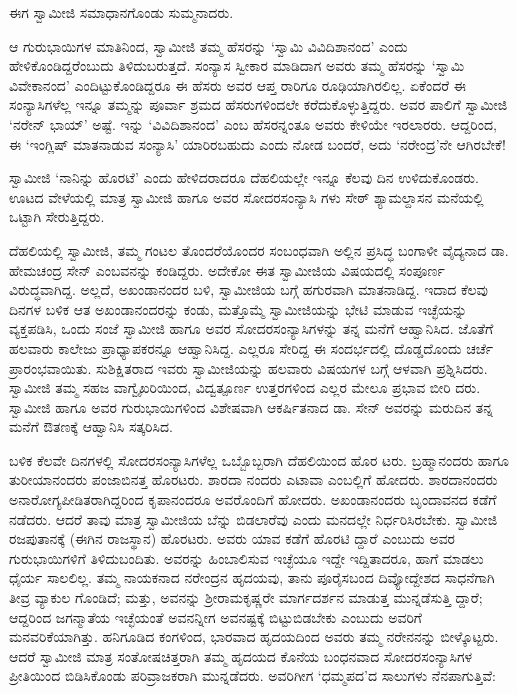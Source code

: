 ಈಗ ಸ್ವಾಮೀಜಿ ಸಮಾಧಾನಗೊಂಡು ಸುಮ್ಮನಾದರು.

ಆ ಗುರುಭಾಯಿಗಳ ಮಾತಿನಿಂದ, ಸ್ವಾಮೀಜಿ ತಮ್ಮ ಹೆಸರನ್ನು ‘ಸ್ವಾಮಿ ವಿವಿದಿಶಾನಂದ’ ಎಂದು ಹೇಳಿಕೊಂಡಿದ್ದರೆಂಬುದು ತಿಳಿದುಬರುತ್ತದೆ. ಸಂನ್ಯಾಸ ಸ್ವೀಕಾರ ಮಾಡಿದಾಗ ಅವರು ತಮ್ಮ ಹೆಸರನ್ನು ‘ಸ್ವಾಮಿ ವಿವೇಕಾನಂದ’ ಎಂದಿಟ್ಟುಕೊಂಡಿದ್ದರೂ ಈ ಹೆಸರು ಅವರ ಆಪ್ತ ರಾರಿಗೂ ರೂಢಿಯಾಗಿರಲಿಲ್ಲ. ಏಕೆಂದರೆ ಈ ಸಂನ್ಯಾಸಿಗಳೆಲ್ಲ ಇನ್ನೂ ತಮ್ಮನ್ನು ಪೂರ್ವಾ ಶ್ರಮದ ಹೆಸರುಗಳಿಂದಲೇ ಕರೆದುಕೊಳ್ಳುತ್ತಿದ್ದರು. ಅವರ ಪಾಲಿಗೆ ಸ್ವಾಮೀಜಿ ‘ನರೇನ್ ಭಾಯ್’ ಅಷ್ಟೆ. ಇನ್ನು ‘ವಿವಿದಿಶಾನಂದ’ ಎಂಬ ಹೆಸರನ್ನಂತೂ ಅವರು ಕೇಳಿಯೇ ಇರಲಾರರು. ಆದ್ದರಿಂದ, ಈ ‘ಇಂಗ್ಲಿಷ್ ಮಾತನಾಡುವ ಸಂನ್ಯಾಸಿ’ ಯಾರಿರಬಹುದು ಎಂದು ನೋಡ ಬಂದರೆ, ಅದು ‘ನರೇಂದ್ರ’ನೇ ಆಗಿರಬೇಕೆ!

ಸ್ವಾಮೀಜಿ ‘ನಾನಿನ್ನು ಹೊರಟೆ’ ಎಂದು ಹೇಳಿದರಾದರೂ ದೆಹಲಿಯಲ್ಲೇ ಇನ್ನೂ ಕೆಲವು ದಿನ ಉಳಿದುಕೊಂಡರು. ಊಟದ ವೇಳೆಯಲ್ಲಿ ಮಾತ್ರ ಸ್ವಾಮೀಜಿ ಹಾಗೂ ಅವರ ಸೋದರಸಂನ್ಯಾಸಿ ಗಳು ಸೇಠ್ ಶ್ಯಾಮಲ್ದಾಸನ ಮನೆಯಲ್ಲಿ ಒಟ್ಟಾಗಿ ಸೇರುತ್ತಿದ್ದರು.

ದೆಹಲಿಯಲ್ಲಿ ಸ್ವಾಮೀಜಿ, ತಮ್ಮ ಗಂಟಲ ತೊಂದರೆಯೊಂದರ ಸಂಬಂಧವಾಗಿ ಅಲ್ಲಿನ ಪ್ರಸಿದ್ಧ ಬಂಗಾಳೀ ವೈದ್ಯನಾದ ಡಾ. ಹೇಮಚಂದ್ರ ಸೇನ್ ಎಂಬವನನ್ನು ಕಂಡಿದ್ದರು. ಅದೇಕೋ ಈತ ಸ್ವಾಮೀಜಿಯ ವಿಷಯದಲ್ಲಿ ಸಂಪೂರ್ಣ ವಿರುದ್ಧವಾಗಿದ್ದ. ಅಲ್ಲದೆ, ಅಖಂಡಾನಂದರ ಬಳಿ, ಸ್ವಾಮೀಜಿಯ ಬಗ್ಗೆ ಹಗುರವಾಗಿ ಮಾತನಾಡಿದ್ದ. ಇದಾದ ಕೆಲವು ದಿನಗಳ ಬಳಿಕ ಆತ ಅಖಂಡಾನಂದರನ್ನು ಕಂಡು, ಮತ್ತೊಮ್ಮೆ ಸ್ವಾಮೀಜಿಯನ್ನು ಭೇಟಿ ಮಾಡುವ ಇಚ್ಛೆಯನ್ನು ವ್ಯಕ್ತಪಡಿಸಿ, ಒಂದು ಸಂಜೆ ಸ್ವಾಮೀಜಿ ಹಾಗೂ ಅವರ ಸೋದರಸಂನ್ಯಾಸಿಗಳನ್ನು ತನ್ನ ಮನೆಗೆ ಆಹ್ವಾನಿಸಿದ. ಜೊತೆಗೆ ಹಲವಾರು ಕಾಲೇಜು ಪ್ರಾಧ್ಯಾಪಕರನ್ನೂ ಆಹ್ವಾನಿಸಿದ್ದ. ಎಲ್ಲರೂ ಸೇರಿದ್ದ ಈ ಸಂದರ್ಭದಲ್ಲಿ ದೊಡ್ಡದೊಂದು ಚರ್ಚೆ ಪ್ರಾರಂಭವಾಯಿತು. ಸುಶಿಕ್ಷಿತರಾದ ಇವರು ಸ್ವಾಮೀಜಿಯನ್ನು ಹಲವಾರು ವಿಷಯಗಳ ಬಗ್ಗೆ ಆಳವಾಗಿ ಪ್ರಶ್ನಿಸಿದರು. ಸ್ವಾಮೀಜಿ ತಮ್ಮ ಸಹಜ ವಾಗ್ವೈಖರಿಯಿಂದ, ವಿದ್ವತ್ಪೂರ್ಣ ಉತ್ತರಗಳಿಂದ ಎಲ್ಲರ ಮೇಲೂ ಪ್ರಭಾವ ಬೀರಿ ದರು. ಸ್ವಾಮೀಜಿ ಹಾಗೂ ಅವರ ಗುರುಭಾಯಿಗಳಿಂದ ವಿಶೇಷವಾಗಿ ಆಕರ್ಷಿತನಾದ ಡಾ. ಸೇನ್ ಅವರನ್ನು ಮರುದಿನ ತನ್ನ ಮನೆಗೆ ಔತಣಕ್ಕೆ ಆಹ್ವಾನಿಸಿ ಸತ್ಕರಿಸಿದ.

ಬಳಿಕ ಕೆಲವೇ ದಿನಗಳಲ್ಲಿ ಸೋದರಸಂನ್ಯಾಸಿಗಳೆಲ್ಲ ಒಬ್ಬೊಬ್ಬರಾಗಿ ದೆಹಲಿಯಿಂದ ಹೊರ ಟರು. ಬ್ರಹ್ಮಾನಂದರು ಹಾಗೂ ತುರೀಯಾನಂದರು ಪಂಜಾಬಿನತ್ತ ಹೊರಟರು. ಶಾರದಾ ನಂದರು ಎಟಾವಾ ಎಂಬಲ್ಲಿಗೆ ಹೋದರು. ಶಾರದಾನಂದರು ಅನಾರೋಗ್ಯಪೀಡಿತರಾಗಿದ್ದರಿಂದ ಕೃಪಾನಂದರೂ ಅವರೊಂದಿಗೆ ಹೋದರು. ಅಖಂಡಾನಂದರು ಬೃಂದಾವನದ ಕಡೆಗೆ ನಡೆದರು. ಆದರೆ ತಾವು ಮಾತ್ರ ಸ್ವಾಮೀಜಿಯ ಬೆನ್ನು ಬಿಡಲಾರೆವು ಎಂದು ಮನದಲ್ಲೇ ನಿರ್ಧರಿಸಿರಬೇಕು. ಸ್ವಾಮೀಜಿ ರಜಪುತಾನಕ್ಕೆ (ಈಗಿನ ರಾಜಸ್ಥಾನ) ಹೊರಟರು. ಅವರು ಯಾವ ಕಡೆಗೆ ಹೊರಟಿ ದ್ದಾರೆ ಎಂಬುದು ಅವರ ಗುರುಭಾಯಿಗಳಿಗೆ ತಿಳಿದುಬಂದಿತು. ಅವರನ್ನು ಹಿಂಬಾಲಿಸುವ ಇಚ್ಛೆಯೂ ಇದ್ದೇ ಇದ್ದಿತಾದರೂ, ಹಾಗೆ ಮಾಡಲು ಧೈರ್ಯ ಸಾಲಲಿಲ್ಲ. ತಮ್ಮ ನಾಯಕನಾದ ನರೇಂದ್ರನ ಹೃದಯವು, ತಾನು ಪೂರೈಸಬಂದ ದಿವ್ಯೋದ್ದೇಶದ ಸಾಧನೆಗಾಗಿ ತೀವ್ರ ವ್ಯಾಕುಲ ಗೊಂಡಿದೆ; ಮತ್ತು, ಅವನನ್ನು ಶ್ರೀರಾಮಕೃಷ್ಣರೇ ಮಾರ್ಗದರ್ಶನ ಮಾಡುತ್ತ ಮುನ್ನಡೆಸುತ್ತಿ ದ್ದಾರೆ; ಆದ್ದರಿಂದ ಜಗನ್ಮಾತೆಯ ಇಚ್ಛೆಯಂತೆ ಅವನನ್ನೀಗ ಅವನಷ್ಟಕ್ಕೆ ಬಿಟ್ಟುಬಿಡಬೇಕು ಎಂಬುದು ಅವರಿಗೆ ಮನವರಿಕೆಯಾಗಿತ್ತು. ಹನಿಗೂಡಿದ ಕಂಗಳಿಂದ, ಭಾರವಾದ ಹೃದಯದಿಂದ ಅವರು ತಮ್ಮ ನರೇನನನ್ನು ಬೀಳ್ಕೊಟ್ಟರು. ಆದರೆ ಸ್ವಾಮೀಜಿ ಮಾತ್ರ ಸಂತೋಷಚಿತ್ತರಾಗಿ ತಮ್ಮ ಹೃದಯದ ಕೊನೆಯ ಬಂಧನವಾದ ಸೋದರಸಂನ್ಯಾಸಿಗಳ ಪ್ರೀತಿಯಿಂದ ಬಿಡಿಸಿಕೊಂಡು ಪರಿವ್ರಾಜಕರಾಗಿ ಮುನ್ನಡೆದರು. ಅವರಿಗೀಗ ‘ಧಮ್ಮಪದ’ದ ಸಾಲುಗಳು ನೆನಪಾಗುತ್ತಿವೆ:

